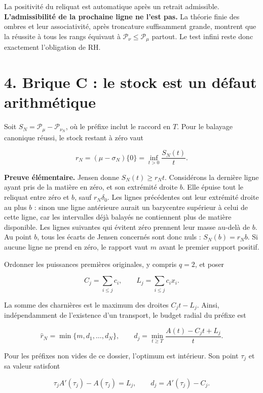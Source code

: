 \documentclass[
  10pt,
  a4paper,
]{article}
\begin{document}
La positivité du reliquat est automatique après un retrait admissible.
\textbf{L'admissibilité de la prochaine ligne ne l'est pas.} La théorie
finie des ombres et leur associativité, après troncature suffisamment
grande, montrent que la réussite à tous les rangs équivaut à
\(\mathcal P_\nu\le\mathcal P_\mu\) partout. Le test infini reste donc
exactement l'obligation de RH.

\hypertarget{brique-c-le-stock-est-un-duxe9faut-arithmuxe9tique}{%
\section{4. Brique C : le stock est un défaut
arithmétique}\label{brique-c-le-stock-est-un-duxe9faut-arithmuxe9tique}}

Soit \(S_N=\mathcal P_\mu-\mathcal P_{\nu_N}\), où le préfixe inclut le
raccord en \(T\). Pour le balayage canonique réussi, le stock restant à
zéro vaut

\[
r_N=(\mu-\sigma_N)\{0\}=\inf_{t>0}\frac{S_N(t)}t.
\tag{B}
\]

\textbf{Preuve élémentaire.} Jensen donne \(S_N(t)\ge r_Nt\).
Considérons la dernière ligne ayant pris de la matière en zéro, et son
extrémité droite \(b\). Elle épuise tout le reliquat entre zéro et
\(b\), sauf \(r_N\delta_0\). Les lignes précédentes ont leur extrémité
droite au plus \(b\) : sinon une ligne antérieure aurait un barycentre
supérieur à celui de cette ligne, car les intervalles déjà balayés ne
contiennent plus de matière disponible. Les lignes suivantes qui évitent
zéro prennent leur masse au-delà de \(b\). Au point \(b\), tous les
écarts de Jensen concernés sont donc nuls : \(S_N(b)=r_Nb\). Si aucune
ligne ne prend en zéro, le rapport vaut \(m\) avant le premier support
positif.

Ordonner les puissances premières originales, y compris \(q=2\), et
poser

\[
C_j=\sum_{i\le j}c_i,\qquad L_j=\sum_{i\le j}c_ix_i.
\]

La somme des charnières est le maximum des droites \(C_jt-L_j\). Ainsi,
indépendamment de l'existence d'un transport, le budget radial du
préfixe est

\[
\widehat r_N=\min\{m,d_1,\ldots,d_N\},\qquad
d_j=\min_{t\ge T}\frac{A(t)-C_jt+L_j}{t}.
\tag{C}
\]

Pour les préfixes non vides de ce dossier, l'optimum est intérieur. Son
point \(\tau_j\) et sa valeur satisfont

\[
\tau_jA'(\tau_j)-A(\tau_j)=L_j,\qquad
d_j=A'(\tau_j)-C_j.
\]
\end{document}

